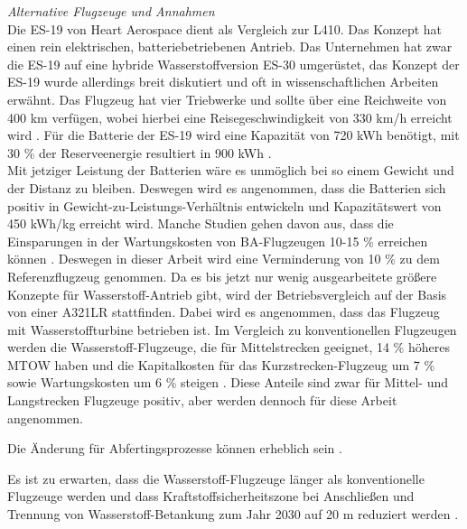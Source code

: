 \textit{Alternative Flugzeuge und Annahmen}\\
Die ES-19 von Heart Aerospace dient als Vergleich zur L410. Das Konzept hat einen rein elektrischen, batteriebetriebenen Antrieb.
Das Unternehmen hat zwar die ES-19 auf eine hybride Wasserstoffversion ES-30 umgerüstet, das Konzept der ES-19 wurde allerdings breit diskutiert 
und oft in wissenschaftlichen Arbeiten erwähnt. Das Flugzeug hat vier Triebwerke und sollte über eine Reichweite von 400 km verfügen, 
wobei hierbei eine Reisegeschwindigkeit von 330 km/h erreicht wird \cite{anker2023feasibility} \cite{heart_aerospace_es19}.
Für die Batterie der ES-19 wird eine Kapazität von 720 kWh benötigt, mit 30 \% der Reserveenergie resultiert in 900 kWh \cite{donckers2024electric}. \\
Mit jetziger Leistung der Batterien wäre es unmöglich bei so einem Gewicht und der Distanz zu bleiben.
Deswegen wird es angenommen, dass die Batterien sich positiv in Gewicht-zu-Leistungs-Verhältnis entwickeln und Kapazitätswert von 450 kWh/kg erreicht wird.
Manche Studien gehen davon aus, dass die Einsparungen in der Wartungskosten von BA-Flugzeugen 10-15 \% erreichen können 
\cite{wangsness2021fremskyndet,avogadro2024demystifying}. 
Deswegen in dieser Arbeit wird eine Verminderung von 10 \% zu dem Referenzflugzeug genommen.
%
Da es bis jetzt nur wenig ausgearbeitete größere Konzepte für Wasserstoff-Antrieb gibt, wird der Betriebsvergleich
auf der Basis von einer A321LR stattfinden. Dabei wird es angenommen, dass das Flugzeug mit Wasserstoffturbine betrieben ist.
Im Vergleich zu konventionellen Flugzeugen werden die Wasserstoff-Flugzeuge, die für Mittelstrecken geeignet, 14 \% höheres MTOW haben 
und die Kapitalkosten für das Kurzstrecken-Flugzeug um 7 \% sowie Wartungskosten um 6 \% steigen \cite{sky2020hydrogen}. 
Diese Anteile sind zwar für Mittel- und Langstrecken Flugzeuge positiv, aber werden dennoch für diese Arbeit angenommen.

Die Änderung für Abfertingsprozesse können erheblich sein \cite{ati_hydrogen_infrastructure}. 

Es ist zu erwarten, dass die Wasserstoff-Flugzeuge länger als konventionelle Flugzeuge werden
und dass Kraftstoffsicherheitszone bei Anschließen und Trennung von Wasserstoff-Betankung zum Jahr 2030 auf 20 m reduziert werden \cite{hoelzen2022h2}.

